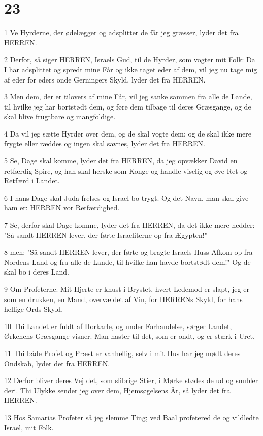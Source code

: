 \chapter{23}

\par 1 Ve Hyrderne, der ødelægger og adsplitter de får jeg græsser, lyder det fra HERREN.
\par 2 Derfor, så siger HERREN, Israels Gud, til de Hyrder, som vogter mit Folk: Da I har adsplittet og spredt mine Får og ikke taget eder af dem, vil jeg nu tage mig af eder for eders onde Gerningers Skyld, lyder det fra HERREN.
\par 3 Men dem, der er tilovers af mine Får, vil jeg sanke sammen fra alle de Lande, til hvilke jeg har bortstødt dem, og føre dem tilbage til deres Græsgange, og de skal blive frugtbare og mangfoldige.
\par 4 Da vil jeg sætte Hyrder over dem, og de skal vogte dem; og de skal ikke mere frygte eller ræddes og ingen skal savnes, lyder det fra HERREN.
\par 5 Se, Dage skal komme, lyder det fra HERREN, da jeg opvækker David en retfærdig Spire, og han skal herske som Konge og handle viselig og øve Ret og Retfærd i Landet.
\par 6 I hans Dage skal Juda frelses og Israel bo trygt. Og det Navn, man skal give ham er: HERREN vor Retfærdighed.
\par 7 Se, derfor skal Dage komme, lyder det fra HERREN, da det ikke mere hedder: "Så sandt HERREN lever, der førte Israeliterne op fra Ægypten!"
\par 8 men: "Så sandt HERREN lever, der førte og bragte Israels Huss Afkom op fra Nordens Land og fra alle de Lande, til hvilke han havde bortstødt dem!" Og de skal bo i deres Land.
\par 9 Om Profeterne. Mit Hjerte er knust i Brystet, hvert Ledemod er slapt, jeg er som en drukken, en Mand, overvældet af Vin, for HERRENs Skyld, for hans hellige Ords Skyld.
\par 10 Thi Landet er fuldt af Horkarle, og under Forhandelse, sørger Landet, Ørkenens Græsgange visner. Man haster til det, som er ondt, og er stærk i Uret.
\par 11 Thi både Profet og Præst er vanhellig, selv i mit Hus har jeg mødt deres Ondskab, lyder det fra HERREN.
\par 12 Derfor bliver deres Vej det, som slibrige Stier, i Mørke stødes de ud og snubler deri. Thi Ulykke sender jeg over dem, Hjemsøgelsens År, så lyder det fra HERREN.
\par 13 Hos Samarias Profeter så jeg slemme Ting; ved Baal profetered de og vildledte Israel, mit Folk.
